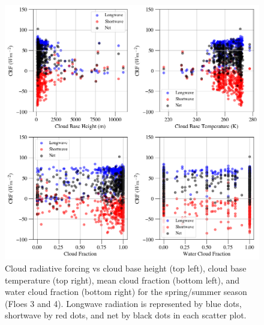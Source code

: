 \begin{figure}[p]
    \centering
    \includegraphics[width=1\linewidth]{figures/chapter4/VSSummer.png}
    \caption[Cloud radiative forcing vs cloud base height, cloud base temperature, cloud fraction, and water cloud fraction for summer.]{Cloud radiative forcing vs cloud base height (top left), cloud base temperature (top right), mean cloud fraction (bottom left), and water cloud fraction (bottom right) for the spring/summer season (Floes 3 and 4). Longwave radiation is represented by blue dots, shortwave by red dots, and net by black dots in each scatter plot.}
    \label{fig:spring:crf}
\end{figure}


